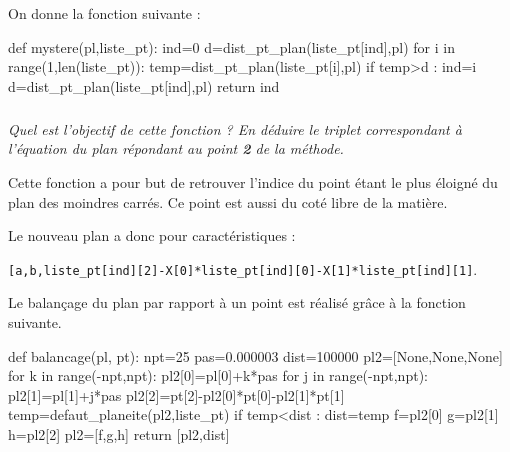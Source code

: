\documentclass[10pt,fleqn]{article} %
\begin{document}
\newpage 

On donne la fonction suivante :

\begin{py}
\begin{python}
def mystere(pl,liste_pt):
    ind=0
    d=dist_pt_plan(liste_pt[ind],pl)
    for i in range(1,len(liste_pt)):
        temp=dist_pt_plan(liste_pt[i],pl)
        if temp>d :
            ind=i
            d=dist_pt_plan(liste_pt[ind],pl)
    return ind
\end{python}
\end{py}

\fi 

\subparagraph{}
\textit{Quel est l'objectif de cette fonction ? En déduire le triplet correspondant à l'équation du plan répondant au point \textbf{2} de la méthode. }
\ifprof
\begin{corrige}
Cette fonction a pour but de retrouver l'indice du point étant le plus éloigné du plan des moindres carrés. Ce point est aussi du coté libre de la matière.

Le nouveau plan a donc pour caractéristiques : 

\texttt{[a,b,liste\_pt[ind][2]-X[0]*liste\_pt[ind][0]-X[1]*liste\_pt[ind][1]}.
\end{corrige}
\else
\fi

\ifprof
\else
Le balançage du plan par rapport à un point est réalisé grâce à la fonction suivante. 

\begin{py}
\begin{python}
def balancage(pl, pt):
    npt=25
    pas=0.000003
    dist=100000
    pl2=[None,None,None]
    for k in range(-npt,npt):
        pl2[0]=pl[0]+k*pas
        for j in range(-npt,npt):
            pl2[1]=pl[1]+j*pas
            pl2[2]=pt[2]-pl2[0]*pt[0]-pl2[1]*pt[1]
            temp=defaut_planeite(pl2,liste_pt)	
            if temp<dist :
                dist=temp
                f=pl2[0]
                g=pl2[1]
                h=pl2[2]
    pl2=[f,g,h]    
    return [pl2,dist]	
\end{python}
\end{py}

\fi
\end{document}
